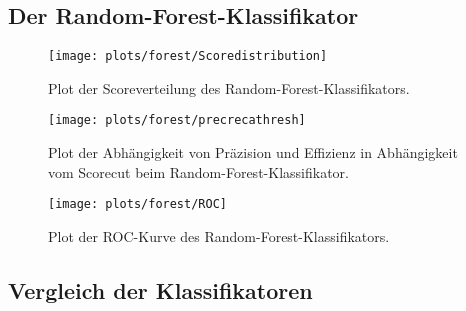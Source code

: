\subsection{Der Random-Forest-Klassifikator}


\begin{figure}
	\centering
	\texttt{[image: plots/forest/Scoredistribution]}
	\caption{Plot der Scoreverteilung des Random-Forest-Klassifikators.}
	\label{fig:RF_SD}
\end{figure}

\begin{figure}
	\centering
	\texttt{[image: plots/forest/precrecathresh]}
	\caption{Plot der Abhängigkeit von Präzision und Effizienz in Abhängigkeit vom Scorecut beim Random-Forest-Klassifikator.}
	\label{fig:RF_PRT}
\end{figure}

\begin{figure}
	\centering
	\texttt{[image: plots/forest/ROC]}
	\caption{Plot der ROC-Kurve des Random-Forest-Klassifikators.}
	\label{fig:RF_ROC}
\end{figure}


\subsection{Vergleich der Klassifikatoren}

